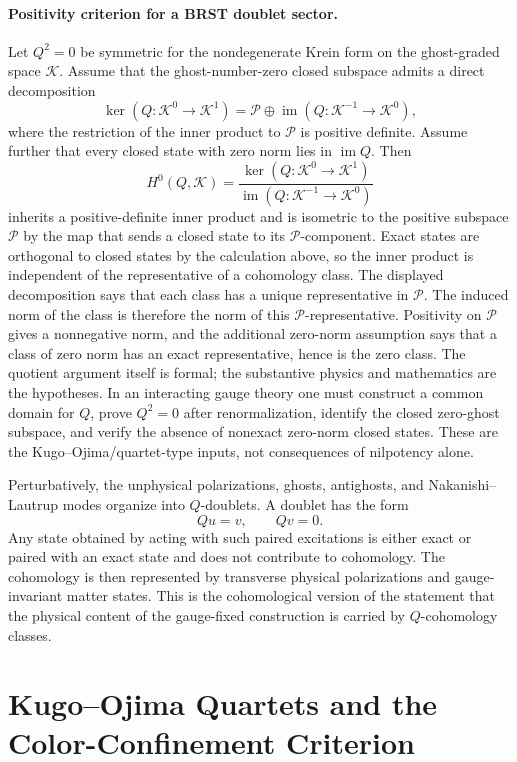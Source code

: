 \paragraph{Positivity criterion for a BRST doublet sector.}
Let \(Q^2=0\) be symmetric for the nondegenerate Krein form on the
ghost-graded space \(\mathcal K\).  Assume that the ghost-number-zero closed
subspace admits a direct decomposition
\[
  \ker(Q:\mathcal K^0\to\mathcal K^1)
  =
  \mathcal P\oplus \operatorname{im}(Q:\mathcal K^{-1}\to\mathcal K^0),
\]
where the restriction of the inner product to \(\mathcal P\) is positive
definite.  Assume further that every closed state with zero norm lies in
\(\operatorname{im}Q\).  Then
\[
  H^0(Q,\mathcal K)
  =
  \frac{\ker(Q:\mathcal K^0\to\mathcal K^1)}
       {\operatorname{im}(Q:\mathcal K^{-1}\to\mathcal K^0)}
\]
inherits a positive-definite inner product and is isometric to the positive
subspace \(\mathcal P\) by the map that sends a closed state to its
\(\mathcal P\)-component.
Exact states are orthogonal to closed states by the calculation above, so the
inner product is independent of the representative of a cohomology class.  The
displayed decomposition says that each class has a unique representative in
\(\mathcal P\).  The induced norm of the class is therefore the norm of this
\(\mathcal P\)-representative.  Positivity on \(\mathcal P\) gives a
nonnegative norm, and the additional zero-norm assumption says that a class of
zero norm has an exact representative, hence is the zero class.
The quotient argument itself is formal; the substantive physics and
mathematics are the hypotheses.  In an interacting gauge theory one must
construct a common domain for \(Q\), prove \(Q^2=0\) after renormalization,
identify the closed zero-ghost subspace, and verify the absence of nonexact
zero-norm closed states.  These are the Kugo--Ojima/quartet-type inputs, not
consequences of nilpotency alone.

Perturbatively, the unphysical polarizations, ghosts, antighosts, and
Nakanishi--Lautrup modes organize into \(Q\)-doublets.  A doublet has the form
\[
  Q u=v,\qquad Qv=0 .
\]
Any state obtained by acting with such paired excitations is either exact or
paired with an exact state and does not contribute to cohomology.  The
cohomology is then represented by transverse physical polarizations and
gauge-invariant matter states.  This is the cohomological version of the
statement that the physical content of the gauge-fixed construction is carried
by \(Q\)-cohomology classes.

\section{Kugo--Ojima Quartets and the Color-Confinement Criterion}

